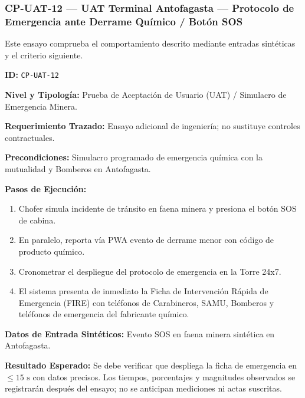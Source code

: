 \subsubsection*{CP-UAT-12 — UAT Terminal Antofagasta — Protocolo de Emergencia ante Derrame Químico / Botón SOS}\label{sec:9-cp-uat-12}
Este ensayo comprueba el comportamiento descrito mediante entradas sintéticas y el criterio siguiente.

\par\noindent\textbf{ID:} \texttt{C\allowbreak{}P\allowbreak{}-\allowbreak{}U\allowbreak{}A\allowbreak{}T\allowbreak{}-\allowbreak{}1\allowbreak{}2\allowbreak{}}\par
\par\noindent\textbf{Nivel y Tipología:} Prueba de Aceptación de Usuario (UAT) / Simulacro de Emergencia Minera.\par
\par\noindent\textbf{Requerimiento Trazado:} Ensayo adicional de ingeniería; no sustituye controles contractuales.\par
\par\noindent\textbf{Precondiciones:} Simulacro programado de emergencia química con la mutualidad y Bomberos en Antofagasta.\par
\par\noindent\textbf{Pasos de Ejecución:} \par
\begin{enumerate}
\item Chofer simula incidente de tránsito en faena minera y presiona el botón SOS de cabina.
\item En paralelo, reporta vía PWA evento de derrame menor con código de producto químico.
\item Cronometrar el despliegue del protocolo de emergencia en la Torre 24x7.
\item El sistema presenta de inmediato la Ficha de Intervención Rápida de Emergencia (FIRE) con teléfonos de Carabineros, SAMU, Bomberos y teléfonos de emergencia del fabricante químico.
\end{enumerate}
\par\noindent\textbf{Datos de Entrada Sintéticos:} Evento SOS en faena minera sintética en Antofagasta.\par
\par\noindent\textbf{Resultado Esperado:} Se debe verificar que despliega la ficha de emergencia en \(\le 15\text{ s}\) con datos precisos. Los tiempos, porcentajes y magnitudes observados se registrarán después del ensayo; no se anticipan mediciones ni actas suscritas.\par
